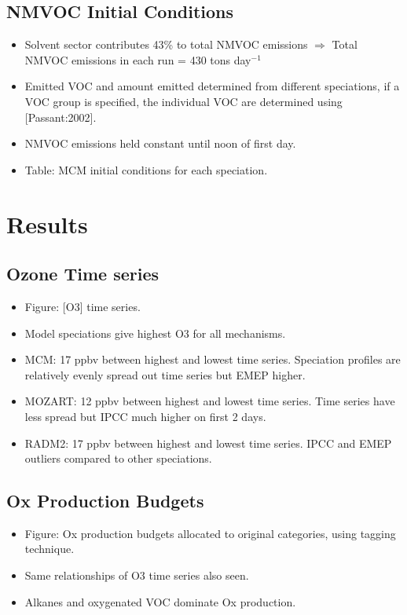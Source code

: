 \documentclass[14pt]{extarticle}
\begin{document}
\subsection{NMVOC Initial Conditions}
\begin{itemize}
    \item Solvent sector contributes 43\% to total NMVOC emissions $\Rightarrow$ Total NMVOC emissions in each run = 430 tons day$^{-1}$
    \item Emitted VOC and amount emitted determined from different speciations, if a VOC group is specified, the individual VOC are determined using [Passant:2002].
	\item NMVOC emissions held constant until noon of first day.
    \item Table: MCM initial conditions for each speciation.
\end{itemize}

\section{Results}

\subsection{Ozone Time series}
\begin{itemize}
	\item Figure: [O3] time series. %
	\item Model speciations give highest O3 for all mechanisms. %
	\item MCM: 17 ppbv between highest and lowest time series. Speciation profiles are relatively evenly spread out time series but EMEP higher.
	\item MOZART: 12 ppbv between highest and lowest time series. Time series have less spread but IPCC much higher on first 2 days.
	\item RADM2: 17 ppbv between highest and lowest time series. IPCC and EMEP outliers compared to other speciations.
\end{itemize}

\subsection{Ox Production Budgets}
\begin{itemize}
	\item Figure: Ox production budgets allocated to original categories, using tagging technique.
    \item Same relationships of O3 time series also seen.
    \item Alkanes and oxygenated VOC dominate Ox production.
\end{itemize}
\end{document}
